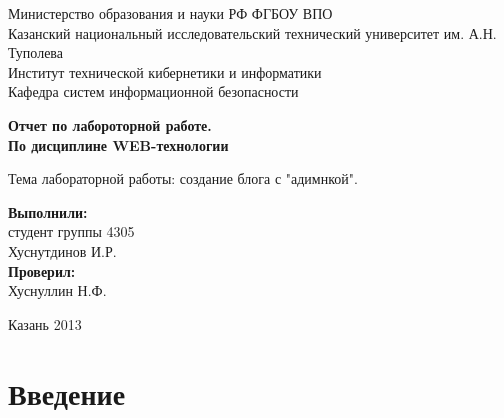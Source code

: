 \documentclass{article}
\begin{document}
\begin{titlepage}

 \begin{center}
Министерство образования и науки РФ ФГБОУ ВПО\\
Казанский национальный исследовательский технический университет им. А.Н. Туполева\\
Институт технической кибернетики и информатики\\
Кафедра систем информационной безопасности\\
 \end{center}
 \vspace{5cm}
 \begin{center}
  \LARGE \bf{Отчет по лабороторной работе.\\ 
  По дисциплине WEB-технологии}
 \end{center}
 \begin{center}\large
  Тема лабораторной работы: создание блога с "адимнкой".
 \end{center}
 \vspace{4cm}
 \large
  \begin{flushright}
   \textbf{Выполнили:}\\
    студент группы 4305 \\
    Хуснутдинов И.Р.\\
      \textbf{Проверил:}\\
    Хуснуллин Н.Ф.\\
 \end{flushright}
 \vspace{3cm}
 \begin{center}
  Казань 2013
 \end{center}
\end{titlepage}


\setcounter{page}{2}            
\newpage                        %
 \tableofcontents                %

\newpage
 \section{Введение}
  
\end{document}
